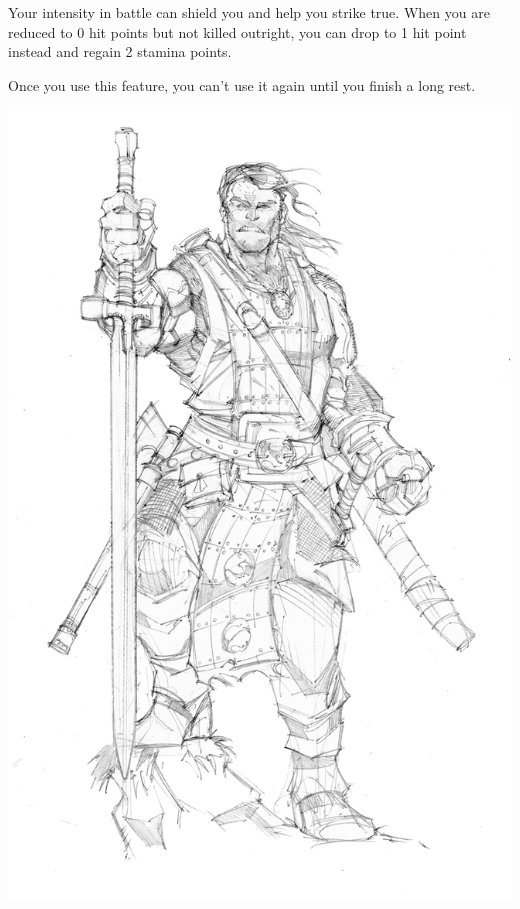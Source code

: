 \begin{multicols*}{2}
Your intensity in battle can shield you and help you strike true. 
When you are reduced to 0 hit points but not killed outright, you can drop to 1 hit point instead and regain 2 stamina points.

Once you use this feature, you can’t use it again until you finish a long rest.

\begin{Figure}
\centering
\includegraphics[width=\textwidth]{img/fighter.png}
\end{Figure}

\end{multicols*}    

\clearpage

